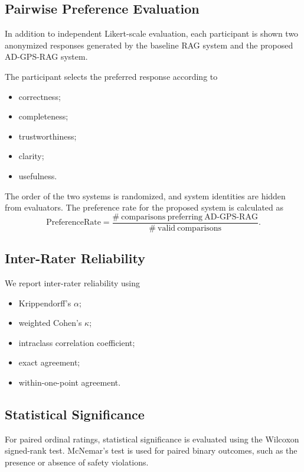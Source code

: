 \documentclass{article}
\begin{document}
\subsection{Pairwise Preference Evaluation}

In addition to independent Likert-scale evaluation, each participant is shown two anonymized responses generated by the baseline RAG system and the proposed AD-GPS-RAG system.

The participant selects the preferred response according to
\begin{itemize}
    \item correctness;
    \item completeness;
    \item trustworthiness;
    \item clarity;
    \item usefulness.
\end{itemize}
The order of the two systems is randomized, and system identities are hidden from evaluators.
The preference rate for the proposed system is calculated as
\begin{equation}
    \mathrm{PreferenceRate}
    =
    \frac{
    \#\mathrm{\ comparisons\ preferring\ AD\text{-}GPS\text{-}RAG}
    }{
    \#\mathrm{\ valid\ comparisons}
    }.
\end{equation}

\subsection{Inter-Rater Reliability}
We report inter-rater reliability using
\begin{itemize}
    \item Krippendorff's $\alpha$;
    \item weighted Cohen's $\kappa$;
    \item intraclass correlation coefficient;
    \item exact agreement;
    \item within-one-point agreement.
\end{itemize}

\subsection{Statistical Significance}
For paired ordinal ratings, statistical significance is evaluated using the Wilcoxon signed-rank test. McNemar's test is used for paired binary outcomes, such as the presence or absence of safety violations.
\end{document}
